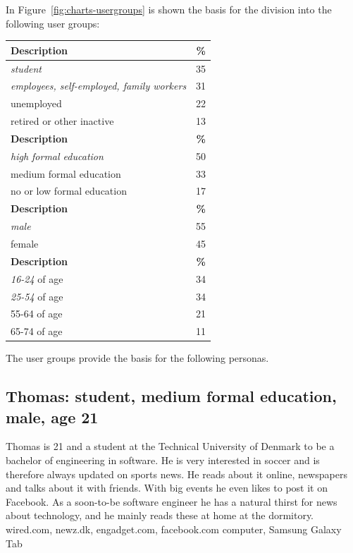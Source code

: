 In Figure~\ref{fig:charts-usergroups} is shown the basis for the division into the following user groups:
\begin{table}[h!tp]
\myfloatalign
	\begin{tabularx}{\textwidth}{p{}|c}
		\toprule
		\textbf{Description} & \textbf{\%}\\
		\midrule
		\emph{student} & 35\\
		\midrule
		\emph{employees, self-employed, family workers} & 31\\
		\midrule
		unemployed & 22\\
		\midrule
		retired or other inactive & 13\\
		\bottomrule

		\textbf{Description} & \textbf{\%}\\
		\midrule
		\emph{high formal education} & 50\\
		\midrule
		medium formal education & 33\\
		\midrule
		no or low formal education & 17\\
		\bottomrule

		\textbf{Description} & \textbf{\%}\\
		\midrule
		\emph{male} & 55\\
		\midrule
		female & 45\\
		\bottomrule

		\textbf{Description} & \textbf{\%}\\
		\midrule
		\emph{16-24} of age & 34\\
		\midrule
		\emph{25-54} of age & 34\\
		\midrule
		55-64 of age & 21\\
		\midrule
		65-74 of age & 11\\
		\midrule
	\end{tabularx}
\end{table}
\clearpage
The user groups provide the basis for the following personas.

\subsection{Thomas: student, medium formal education, male, age 21}
Thomas is 21 and a student at the Technical University of Denmark to be a bachelor of engineering in software. He is very interested in soccer and is therefore always updated on sports news. He reads about it online, newspapers and talks about it with friends. With big events he even likes to post it on Facebook. As a soon-to-be software engineer he has a natural thirst for news about technology, and he mainly reads these at home at the dormitory.
wired.com, newz.dk, engadget.com, facebook.com
computer, Samsung Galaxy Tab

